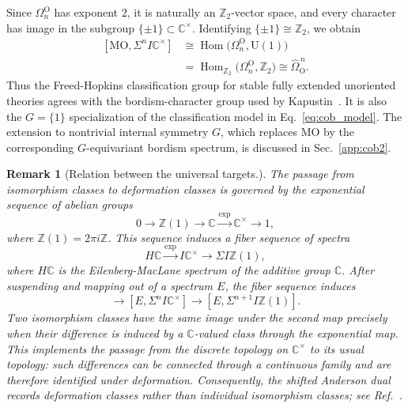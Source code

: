 \documentclass[aps,prx,reprint,superscriptaddress,twocolumn,amsmath,amssymb,amsfonts, nofootinbib]{revtex4-2}
\newcommand{\Z}{\mathbb{Z}}
\theoremstyle{apsstyle}
\newtheorem{remark}[theorem]{Remark}
\begin{document}
\bigskip 

Since $\Omega_n^{\mathrm O}$ has exponent $2$, it is naturally an $\Z_2$-vector space, and every character has image in the subgroup $\{\pm1\}\subset\mathbb C^\times$. Identifying $\{\pm1\}\cong\mathbb Z_2$, we obtain
\begin{equation}
\begin{aligned}
    \left[
        \mathrm{MO},
        \Sigma^nI\mathbb C^\times
    \right]
    &\cong
    \operatorname{Hom}
    \bigl(\Omega_n^{\mathrm O},\mathrm U(1)\bigr)\\
    &=\operatorname{Hom}_{\Z_{2}}
    \bigl(\Omega_n^{\mathrm O},\Z_{2}\bigr)\cong
    \widehat{\Omega}_{\mathrm O}^{\,n}.
\end{aligned}
\label{eq:FH_Kapustin_bordism_classification}
\end{equation}
Thus the Freed-Hopkins classification group for stable fully extended unoriented theories agrees with the bordism-character group used by Kapustin~\cite{Kapustin2014}. It is also the $G=\{1\}$ specialization of the classification model in Eq.~\eqref{eq:cob_model}. The extension to nontrivial internal symmetry $G$, which replaces $\mathrm{MO}$ by the corresponding $G$-equivariant bordism spectrum, is discussed in Sec.~\ref{app:cob2}.

\bigskip 

\begin{remark}[Relation between the universal targets.]
The passage from isomorphism classes to deformation classes is governed by the exponential sequence of abelian groups
\begin{equation}
    0 \longrightarrow
    \mathbb Z(1)
    \longrightarrow
    \mathbb C
    \xrightarrow{\exp}
    \mathbb C^\times
    \longrightarrow
    1,
    \label{eq:exponential_sequence_coefficients}
\end{equation}
where $\mathbb Z(1)=2\pi i\mathbb Z$. This sequence induces a fiber
sequence of spectra
\begin{equation}
    H\mathbb C
    \xrightarrow{\exp}
    I\mathbb C^\times
    \longrightarrow
    \Sigma I\mathbb Z(1),
    \label{eq:BC_Anderson_fiber_sequence}
\end{equation}
where $H\mathbb C$ is the Eilenberg-MacLane spectrum of the additive
group $\mathbb C$. After suspending and mapping out of a spectrum $E$, the fiber sequence
induces
\begin{equation}
    [E,\Sigma^nH\mathbb C\bigr]
    \longrightarrow
    [E,\Sigma^nI\mathbb C^\times]
    \longrightarrow [E,\Sigma^{n+1}I\mathbb Z(1)].
\label{eq:BC_to_Anderson_map}
\end{equation}
Two isomorphism classes have the same image under the second map
precisely when their difference is induced by a
$\mathbb C$-valued class through the exponential map. This implements
the passage from the discrete topology on $\mathbb C^\times$ to its
usual topology: such differences can be connected through a continuous
family and are therefore identified under deformation. Consequently,
the shifted Anderson dual records deformation classes rather than
individual isomorphism classes; see Ref.~\cite[Sec.~5.3]{FreedHopkins}.
\end{remark}
\end{document}
